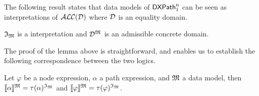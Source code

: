 The following result states that data models of $\mathsf{DXPath}_{\rm 1}^{\rm n}$ can be seen as interpretations of $\mathcal{ALC(D)}$ where $\mathcal{D}$ is an equality domain.

\begin{lemma}\label{lemma:models-xp-dl}
    $\mathfrak{I}_{\mathfrak{M}}$ is a interpretation and $\mathcal{D}^{\mathfrak{M}}$ is an admissible concrete domain.
\end{lemma}

The proof of the lemma above is straightforward, and enables us to establish the following correspondence between the two logics. 

\begin{theorem}\label{th:translation-correctness}
    Let $\varphi$ be a node expression, $\alpha$ a path expression, and $\mathfrak{M}$ a data model, then $\llbracket{\alpha}\rrbracket^{\mathfrak{M}}=\operatorname{\tau}(\alpha)^{\mathfrak{I}_{\mathfrak{M}}}$ and $\llbracket{\varphi}\rrbracket^{\mathfrak{M}}=\operatorname{\tau}(\varphi)^{\mathfrak{I}_{\mathfrak{M}}}$. 
\end{theorem}
